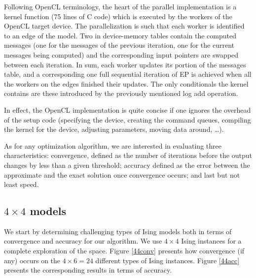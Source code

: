 \documentclass[times, 10pt,twocolumn]{article}
\begin{document}
Following OpenCL terminology, the heart of the parallel implementation is a kernel function (75 lines of C code) which is executed by the workers of the OpenCL target device. The parallelization is such that each worker is identified to an edge of the model. Two in device-memory tables contain the computed messages (one for the messages of the previous iteration, one for the current messages being computed) and the corresponding input pointers are swapped between each iteration. In sum, each worker updates its portion of the messages table, and a corresponding one full sequential iteration of EP is achieved when all the workers on the edges finished their updates. The only conditionals the kernel contains are these introduced by the previously mentioned log add operation.

In effect, the OpenCL implementation is quite concise if one ignores the overhead of the setup code (specifying the device, creating the command queues, compiling the kernel for the device, adjusting parameters, moving data around, \dots).

As for any optimization algorithm, we are interested in evaluating three characteristics: convergence, defined as the number of iterations before the output changes by less than a given threshold; accuracy defined as the error between the approximate and the exact solution once convergence occurs; and last but not least speed.

\subsection{$4 \times 4$ models}
We start by determining challenging types of Ising models both in terms of convergence and accuracy for our algorithm. We use $4 \times 4$ Ising instances for a complete exploration of the space. Figure \ref{44conv} presents how convergence (if any) occurs on the $4 \times 6 = 24$ different types of Ising instances. Figure \ref{44acc} presents the corresponding results in terms of accuracy.
\end{document}
